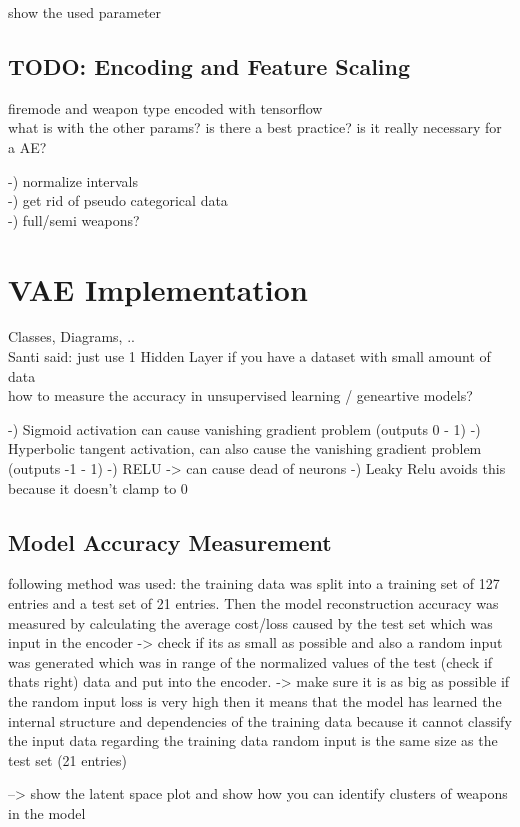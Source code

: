 \documentclass[MGS,Master,english]{twbook}%
\begin{document}
show the used parameter 

\subsection{TODO: Encoding and Feature Scaling}
firemode and weapon type encoded with tensorflow\\
what is with the other params? is there a best practice? is it really necessary for a AE? 

-) normalize intervals\\
-) get rid of pseudo categorical data \\
-) full/semi weapons?



\section{VAE Implementation}
Classes, Diagrams, ..\\
Santi said: just use 1 Hidden Layer if you have a dataset with small amount of data\\
how to measure the accuracy in unsupervised learning / geneartive models?

-) Sigmoid activation can cause vanishing gradient problem (outputs 0 - 1)
-) Hyperbolic tangent activation, can also cause the vanishing gradient problem (outputs -1 - 1)
-) RELU -> can cause dead of neurons
-) Leaky Relu avoids this because it doesn't clamp to 0

\subsection{Model Accuracy Measurement}
following method was used: 
the training data was split into a training set of 127 entries and a test set of 21 entries. 
Then the model reconstruction accuracy was measured by calculating the average cost/loss caused by the test set which was input in the encoder -> check if its as small as possible
and also a random input was generated which was in range of the normalized values of the test (check if thats right) data and put into the encoder. -> make sure it is as big as possible
if the random input loss is very high then it means that the model has learned the internal structure and dependencies of the training data because it cannot classify the input data regarding the training data
random input is the same size as the test set (21 entries)

--> show the latent space plot and show how you can identify clusters of weapons in the model
\end{document}
